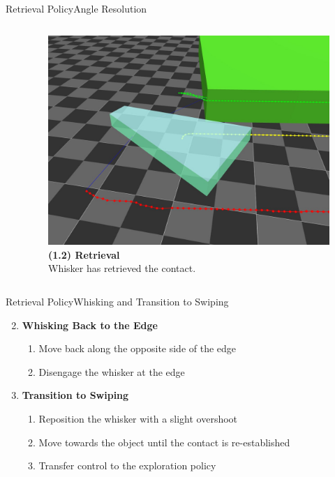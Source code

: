 \documentclass[AIRbeamer
,optEnglish
,optBiber
,optBibstyleAlphabetic
,optBeamerClassicFormat%
]{AIRlatex}
\begin{document}
\begin{frame}[c]{Retrieval Policy}{Angle Resolution}
\begin{columns}[T,onlytextwidth]
\begin{column}[T]{0.48\textwidth}
            \end{column}
            \begin{column}[T]{0.48\textwidth}
                \begin{figure}[H]
                    \centering
                    \captionsetup{justification=centering}
                    \includegraphics[width=\textwidth]{figures/retrieval/retrieval}
                    \caption{\textbf{(1.2) Retrieval}\\Whisker has retrieved the contact.}
                \end{figure}
            \end{column}
        \end{columns}
    \end{frame}
    \begin{frame}[c]{Retrieval Policy}{Whisking and Transition to Swiping}
        \begin{enumerate}
            \setcounter{enumi}{1}
            \item \textbf{Whisking Back to the Edge}
            \begin{enumerate}
                \item Move back along the opposite side of the edge
                \item Disengage the whisker at the edge
            \end{enumerate}
            \item \textbf{Transition to Swiping}
            \begin{enumerate}
                \item Reposition the whisker with a slight overshoot
                \item Move towards the object until the contact is re-established
                \item Transfer control to the exploration policy
            \end{enumerate}
        \end{enumerate}
    \end{frame}
\end{document}
